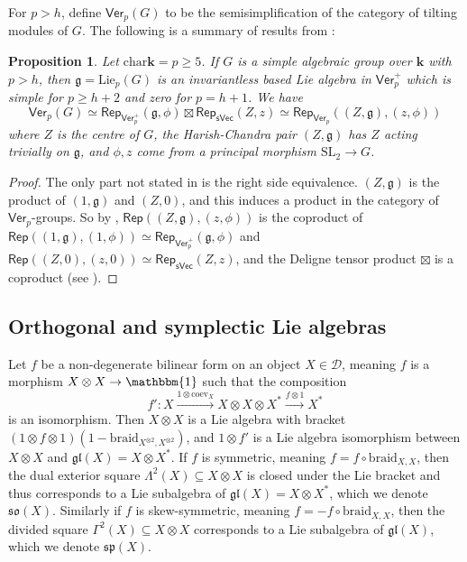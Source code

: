 \documentclass[11pt,a4paper,reqno]{amsart}
\newtheorem{prop}[theorem]{Proposition}
\theoremstyle{definition}
\newcommand{\bk}{\mathbf{k}}
\newcommand{\cD}{\mathcal{D}}
\numberwithin{equation}{section}
\newcommand{\coev}{\mathrm{coev}}
\newcommand{\braid}{\mathrm{braid}}
\newcommand{\charr}{\mathrm{char}}
\newcommand{\Ver}{\mathsf{Ver}}
\newcommand{\Rep}{\mathsf{Rep}}
\newcommand{\unit}{{\mathbbm{1}}}
\newcommand{\fg}{\mathfrak{g}}
\newcommand{\fgl}{\mathfrak{gl}}
\newcommand{\fso}{\mathfrak{so}}
\newcommand{\fsp}{\mathfrak{sp}}
\newcommand{\Lie}{\mathrm{Lie}}
\newcommand{\sVec}{\mathsf{sVec}}
\newcommand{\SL}{\mathrm{SL}}
\begin{document}
For $p>h$, define $\Ver_p(G)$ to be the semisimplification of the category of tilting modules of $G$. The following is a summary of results from \cite[\S3]{CEN}:

\begin{prop}\label{PropVerpG}
Let $\charr\bk=p\geq5$. If $G$ is a simple algebraic group over $\bk$ with $p>h$, then $\fg=\Lie_p(G)$ is an invariantless based Lie algebra in $\Ver_p^+$ which is simple for $p\geq h+2$ and zero for $p=h+1$. We have
\[\Ver_p(G)\simeq\Rep_{\Ver_p^+}(\fg,\phi)\boxtimes\Rep_{\sVec}(Z,z)\simeq\Rep_{\Ver_p}((Z,\fg),(z,\phi))\]
where $Z$ is the centre of $G$, the Harish-Chandra pair $(Z,\fg)$ has $Z$ acting trivially on $\fg$, and $\phi,z$ come from a principal morphism $\SL_2\to G$.
\end{prop}

\begin{proof}
The only part not stated in \cite{CEN} is the right side equivalence. $(Z,\fg)$ is the product of $(1,\fg)$ and $(Z,0)$, and this induces a product in the category of $\Ver_p$-groups. So by \cite[Theorem~4.2.1]{incompressible}, $\Rep((Z,\fg),(z,\phi))$ is the coproduct of $\Rep((1,\fg),(1,\phi))\simeq\Rep_{\Ver_p^+}(\fg,\phi)$ and $\Rep((Z,0),(z,0))\simeq\Rep_{\sVec}(Z,z)$, and the Deligne tensor product $\boxtimes$ is a coproduct (see \cite[\S 2.2.6]{incompressible}).
\end{proof}

\subsection{Orthogonal and symplectic Lie algebras}\label{SecSOSp} Let $f$ be a non-degenerate bilinear form on an object $X\in\cD$, meaning $f$ is a morphism $X\otimes X\to\unit$ such that the composition
\[f':X\xrightarrow{1\otimes\coev_X}X\otimes X\otimes X^*\xrightarrow{f\otimes 1}X^*\]
is an isomorphism. Then $X\otimes X$ is a Lie algebra with bracket $(1\otimes f\otimes 1)(1-\braid_{X^{\otimes2},X^{\otimes2}})$, and $1\otimes f'$ is a Lie algebra isomorphism between $X\otimes X$ and $\fgl(X)=X\otimes X^*$. If $f$ is symmetric, meaning $f=f\circ\braid_{X,X}$, then the dual exterior square $\Lambda^2(X)\subseteq X\otimes X$ is closed under the Lie bracket and thus corresponds to a Lie subalgebra of $\fgl(X)=X\otimes X^*$, which we denote $\fso(X)$. Similarly if $f$ is skew-symmetric, meaning $f=-f\circ\braid_{X,X}$, then the divided square $\Gamma^2(X)\subseteq X\otimes X$ corresponds to a Lie subalgebra of $\fgl(X)$, which we denote $\fsp(X)$.
\end{document}
